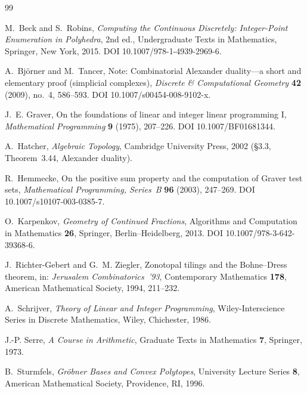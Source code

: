 \begin{thebibliography}{99}

M.~Beck and S.~Robins, \emph{Computing the Continuous Discretely: Integer-Point Enumeration in Polyhedra}, 2nd ed., Undergraduate Texts in Mathematics, Springer, New York, 2015. DOI 10.1007/978-1-4939-2969-6.

A.~Bj\"orner and M.~Tancer, Note: Combinatorial Alexander duality---a short and elementary proof (simplicial complexes), \emph{Discrete \& Computational Geometry} \textbf{42} (2009), no.~4, 586--593. DOI 10.1007/s00454-008-9102-x.

J.~E. Graver, On the foundations of linear and integer linear programming I, \emph{Mathematical Programming} \textbf{9} (1975), 207--226. DOI 10.1007/BF01681344.

A.~Hatcher, \emph{Algebraic Topology}, Cambridge University Press, 2002 (\S3.3, Theorem~3.44, Alexander duality).

R.~Hemmecke, On the positive sum property and the computation of Graver test sets, \emph{Mathematical Programming, Series~B} \textbf{96} (2003), 247--269. DOI 10.1007/s10107-003-0385-7.

O.~Karpenkov, \emph{Geometry of Continued Fractions}, Algorithms and Computation in Mathematics \textbf{26}, Springer, Berlin--Heidelberg, 2013. DOI 10.1007/978-3-642-39368-6.

J.~Richter-Gebert and G.~M. Ziegler, Zonotopal tilings and the Bohne--Dress theorem, in: \emph{Jerusalem Combinatorics~'93}, Contemporary Mathematics \textbf{178}, American Mathematical Society, 1994, 211--232.

A.~Schrijver, \emph{Theory of Linear and Integer Programming}, Wiley-Interscience Series in Discrete Mathematics, Wiley, Chichester, 1986.

J.-P. Serre, \emph{A Course in Arithmetic}, Graduate Texts in Mathematics \textbf{7}, Springer, 1973.

B.~Sturmfels, \emph{Gr\"obner Bases and Convex Polytopes}, University Lecture Series \textbf{8}, American Mathematical Society, Providence, RI, 1996.


\end{thebibliography}
